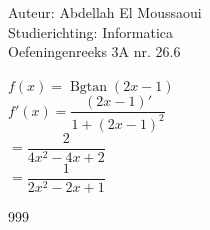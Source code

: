 \documentclass[a4paper]{article}
\begin{document}
  
\noindent \large Auteur: Abdellah El Moussaoui \\
\noindent \large Studierichting: Informatica\\
\noindent \large Oefeningenreeks 3A nr. 26.6\\

\medskip

\normalsize

$f(x)=\operatorname{Bgtan}\left(2x-1\right)$\\


$f'(x)=\dfrac{\left(2x-1\right)'}{1+\left(2x-1\right)^2}$\\

$=\dfrac{2}{4x^2-4x+2}$\\

$=\dfrac{1}{2x^2-2x+1}$\\



\begin{thebibliography}{999}
\end{thebibliography}
\end{document}
